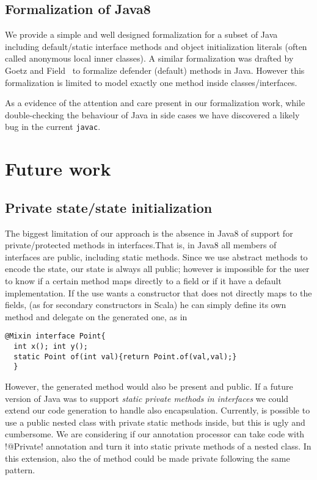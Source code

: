 \subsection{Formalization of Java8}
We provide a simple and well designed formalization for a subset of Java including default/static interface methods and object initialization literals (often called anonymous local inner classes).
A similar formalization was drafted by
Goetz and Field~\cite{goetz12fdefenders} to formalize defender (default) methods
in Java. However this formalization is limited to model exactly one
method inside classes/interfaces.

As a evidence of the attention and care present in our formalization work, while double-checking the behaviour of Java in side cases we have discovered a likely bug in the current \texttt{javac}.

\section{Future work}

\subsection{Private state/state initialization}
The biggest limitation of our approach is the absence in Java8 of support for private/protected methods in interfaces.That is, in Java8 all members of interfaces are public, including static methods.
Since we use abstract methods to encode the state, our state is always all public; however is impossible for the user to know if a certain method maps directly to a field or if it have a default implementation.
If the use wants a constructor that does not directly maps to the fields, (as for secondary constructors in Scala) he can simply define its own \Q@of@ method and delegate on the generated one, as in
\begin{lstlisting}
@Mixin interface Point{
  int x(); int y();
  static Point of(int val){return Point.of(val,val);}  
  }
\end{lstlisting}
However, the generated \Q@of@ method would also be present and public.
If a future version of Java was to support \emph{static private methods in interfaces} we could extend our code generation to handle also encapsulation.
Currently, is possible to use a public nested class with private static methods inside, but this is ugly and cumbersome. We are considering if our annotation processor can take code with \Q!@Private! annotation and turn it into static private methods of a nested class. In this extension,  also the of method could be made private following the same pattern. 

